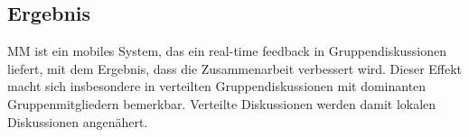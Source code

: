 \subsection{Ergebnis}
MM ist ein mobiles System, das ein real-time feedback in Gruppendiskussionen
liefert, mit dem Ergebnis, dass die Zusammenarbeit verbessert wird.
Dieser Effekt macht sich insbesondere in verteilten Gruppendiskussionen mit
dominanten Gruppenmitgliedern bemerkbar. Verteilte Diskussionen werden damit
lokalen Diskussionen angenähert.


